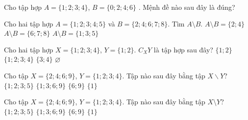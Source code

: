 

\begin{ex}%
	Cho tập hợp $A=\{1;2;3;4\}$, $B=\{0;2;4;6\}$ .  Mệnh đề nào sau đây là đúng?
\end{ex}

\begin{ex}%
	Cho hai tập hợp $A=\{1;2;3;4;5\}$ và $B=\{2;4;6;7;8\}$. Tìm $A\setminus B$. 
		{$A\setminus  B=\{2;4\}$}
		 {$A\setminus B=\{6;7;8\}$}
		 {\True$A\setminus B=\{1;3;5\}$}
\end{ex}

\begin{ex}%
	 Cho hai tập hợp $X=\{1;2;3;4\}$, $Y=\{1;2\}$. $C_{X}Y$ là tập hợp sau đây?
	\choice 
		{$\{1;2\}$} 
		{$\{1;2;3;4\}$} 
		 {\True $\{3;4\}$}
		{$\varnothing$} 
\end{ex}

\begin{ex}%
	Cho tập $X=\{2;4;6;9\}$, $Y=\{1;2;3;4\}$. Tập  nào sau đây bằng tập $X\backslash Y$?
	 \choice
		 {$\{1;2;3;5\}$}
		 {$\{1;3;6;9\}$}
		{\True  $\{6;9\}$}
		 {$\{1\}$}
\end{ex}

\begin{ex}%
	Cho  tập $X=\{2; 4; 6; 9\}$, $Y=\{1; 2; 3; 4\}$. Tập nào sau đây bằng tập $X \setminus Y$?
	\choice 
		{$\{1;  2; 3; 5\}$}
		{$\{1; 3;  6; 9\}$}
		{\True  $\{6; 9\}$}
		 {$\{1\}$}
\end{ex}

